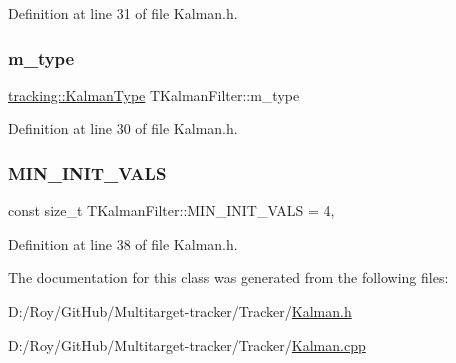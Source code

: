 Definition at line 31 of file Kalman.\+h.

\mbox{\label{class_t_kalman_filter_a00cabc6683f6cc848559515df46d7101}} 
\subsubsection{\texorpdfstring{m\+\_\+type}{m\_type}}
{\footnotesize\ttfamily \mbox{\hyperlink{namespacetracking_a83f2c4d58ea2737f7d6296dce3eb722a}{tracking\+::\+Kalman\+Type}} T\+Kalman\+Filter\+::m\+\_\+type\hspace{0.3cm}{\ttfamily [private]}}



Definition at line 30 of file Kalman.\+h.

\mbox{\label{class_t_kalman_filter_a4511a3b64d2232e516b396e8783220cf}} 
\subsubsection{\texorpdfstring{M\+I\+N\+\_\+\+I\+N\+I\+T\+\_\+\+V\+A\+LS}{MIN\_INIT\_VALS}}
{\footnotesize\ttfamily const size\+\_\+t T\+Kalman\+Filter\+::\+M\+I\+N\+\_\+\+I\+N\+I\+T\+\_\+\+V\+A\+LS = 4\hspace{0.3cm}{\ttfamily [static]}, {\ttfamily [private]}}



Definition at line 38 of file Kalman.\+h.



The documentation for this class was generated from the following files\+:\begin{DoxyCompactItemize}
\item 
D\+:/\+Roy/\+Git\+Hub/\+Multitarget-\/tracker/\+Tracker/\mbox{\hyperlink{_kalman_8h}{Kalman.\+h}}\item 
D\+:/\+Roy/\+Git\+Hub/\+Multitarget-\/tracker/\+Tracker/\mbox{\hyperlink{_kalman_8cpp}{Kalman.\+cpp}}\end{DoxyCompactItemize}
